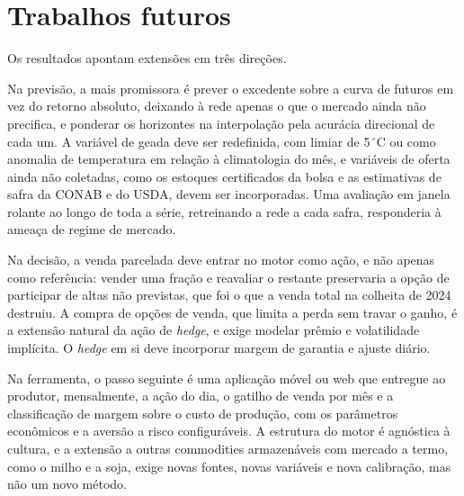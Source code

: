 \section{Trabalhos futuros}

Os resultados apontam extensões em três direções.

Na previsão, a mais promissora é prever o excedente sobre a curva de futuros em vez do retorno absoluto, deixando à rede apenas o que o mercado ainda não precifica, e ponderar os horizontes na interpolação pela acurácia direcional de cada um. A variável de geada deve ser redefinida, com limiar de 5\,$^{\circ}$C ou como anomalia de temperatura em relação à climatologia do mês, e variáveis de oferta ainda não coletadas, como os estoques certificados da bolsa e as estimativas de safra da CONAB e do USDA, devem ser incorporadas. Uma avaliação em janela rolante ao longo de toda a série, retreinando a rede a cada safra, responderia à ameaça de regime de mercado.

Na decisão, a venda parcelada deve entrar no motor como ação, e não apenas como referência: vender uma fração e reavaliar o restante preservaria a opção de participar de altas não previstas, que foi o que a venda total na colheita de 2024 destruiu. A compra de opções de venda, que limita a perda sem travar o ganho, é a extensão natural da ação de \textit{hedge}, e exige modelar prêmio e volatilidade implícita. O \textit{hedge} em si deve incorporar margem de garantia e ajuste diário.

Na ferramenta, o passo seguinte é uma aplicação móvel ou web que entregue ao produtor, mensalmente, a ação do dia, o gatilho de venda por mês e a classificação de margem sobre o custo de produção, com os parâmetros econômicos e a aversão a risco configuráveis. A estrutura do motor é agnóstica à cultura, e a extensão a outras commodities armazenáveis com mercado a termo, como o milho e a soja, exige novas fontes, novas variáveis e nova calibração, mas não um novo método.
